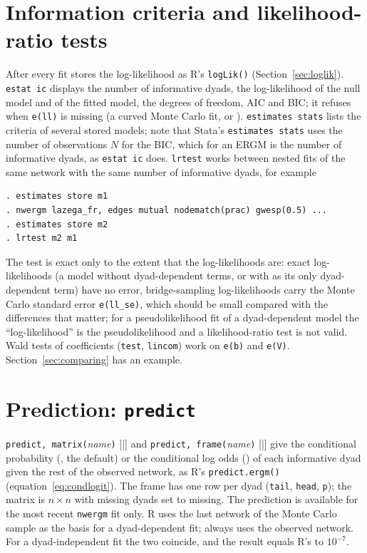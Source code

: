 \section{Information criteria and likelihood-ratio tests}\label{sec:ic}

After every fit \nwergm{} stores the log-likelihood as R's \texttt{logLik()} (Section~\ref{sec:loglik}). \texttt{estat ic} displays the number of informative dyads, the log-likelihood of the null model and of the fitted model, the degrees of freedom, AIC and BIC; it refuses when \texttt{e(ll)} is missing (a curved Monte Carlo fit, or ). \texttt{estimates stats} lists the criteria of several stored models; note that Stata's \texttt{estimates stats} uses the number of observations $N$ for the BIC, which for an ERGM is the number of informative dyads, as \texttt{estat ic} does. \texttt{lrtest} works between nested fits of the same network with the same number of informative dyads, for example
\begin{lstlisting}
. estimates store m1
. nwergm lazega_fr, edges mutual nodematch(prac) gwesp(0.5) ...
. estimates store m2
. lrtest m2 m1
\end{lstlisting}
The test is exact only to the extent that the log-likelihoods are: exact log-likelihoods (a model without dyad-dependent terms, or with  as its only dyad-dependent term) have no error, bridge-sampling log-likelihoods carry the Monte Carlo standard error \texttt{e(ll\_se)}, which should be small compared with the differences that matter; for a pseudolikelihood fit of a dyad-dependent model the ``log-likelihood'' is the pseudolikelihood and a likelihood-ratio test is not valid. Wald tests of coefficients (\texttt{test}, \texttt{lincom}) work on \texttt{e(b)} and \texttt{e(V)}. Section~\ref{sec:comparing} has an example.

\section{Prediction: \texttt{predict}}\label{sec:predict}

\texttt{predict, matrix(}\emph{name}\texttt{)} [|] and \texttt{predict, frame(}\emph{name}\texttt{)} [|] give the conditional probability (, the default) or the conditional log odds () of each informative dyad given the rest of the observed network, as R's \texttt{predict.ergm()} (equation~\eqref{eq:condlogit}). The frame has one row per dyad (\texttt{tail}, \texttt{head}, \texttt{p}); the matrix is $n\times n$ with missing dyads set to missing. The prediction is available for the most recent \texttt{nwergm} fit only. R uses the last network of the Monte Carlo sample as the basis for a dyad-dependent fit; \nwergm{} always uses the observed network. For a dyad-independent fit the two coincide, and the result equals R's to $10^{-7}$.

